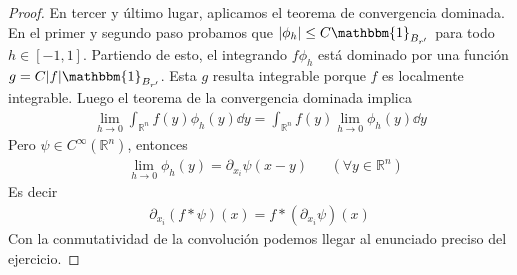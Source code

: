\documentclass{article}
\newcommand{\characteristic}{\mathbbm{1}}
\newcommand{\realNumbers}{\mathbb{R}}
\theoremstyle{remark}
\begin{document}
\begin{proof}
  En tercer y último lugar, aplicamos el teorema de convergencia dominada.
  En el primer y segundo paso probamos que \(\abs{\phi_h} \leq C \characteristic_{B_{r'}}\) para todo \(h \in [- 1, 1]\).
  Partiendo de esto, el integrando \(f \phi_h\) está dominado por una función \(g = C \abs{f} \characteristic_{B_{r'}}\).
  Esta \(g\) resulta integrable porque \(f\) es localmente integrable.
  Luego el teorema de la convergencia dominada implica
  \begin{align}
    \lim_{h \rightarrow 0}
      \int_{\realNumbers^n} f(y) \phi_h(y) \dd y
    =
    \int_{\realNumbers^n}
      f(y)
      \lim_{h \rightarrow 0} \phi_h(y) \dd y
  \end{align}
  Pero \(\psi \in C^{\infty}(\realNumbers^n)\), entonces
  \begin{align}
    &\lim_{h \rightarrow 0} \phi_h(y) = \partial_{x_i} \psi (x - y)
    && (\forall y \in \realNumbers^n)
  \end{align}
  Es decir
  \begin{align}
    \partial_{x_i} (f * \psi) (x)
    =
    f * (\partial_{x_i} \psi) (x)
  \end{align}
  Con la conmutatividad de la convolución podemos llegar al enunciado preciso del ejercicio.
\end{proof}
\end{document}
